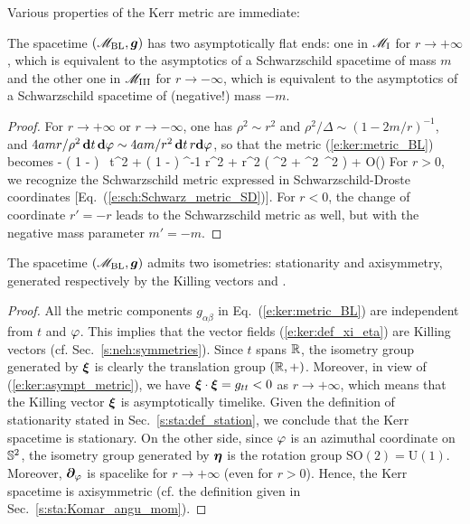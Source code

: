 Various properties of the Kerr metric are immediate:

\begin{prop}
The spacetime $(\mathscr{M}_{\rm BL},\bm{g})$ has two asymptotically flat ends: one in
$\mathscr{M}_{\rm I}$ for $r\rightarrow + \infty$, which is equivalent to the asymptotics
of a Schwarzschild spacetime of mass $m$ and the other one
in $\mathscr{M}_{\rm III}$ for $r\rightarrow - \infty$, which is equivalent to
the asymptotics of a Schwarzschild spacetime of (negative!) mass $-m$.
\end{prop}

\begin{proof}
For $r\rightarrow+\infty$ or $r\rightarrow-\infty$, one has $\rho^2\sim r^2$ and
$\rho^2/\Delta \sim (1-2m/r)^{-1}$,
and $4 a m  r / \rho^2\,  \mathbf{d} t\, \mathbf{d}\varphi \sim 4 a m/r^2 \,  \mathbf{d} t\, r\mathbf{d}\varphi$,
so that the metric (\ref{e:ker:metric_BL}) becomes
\be \label{e:ker:asympt_metric}
      \simeq  - \left( 1 -  \right) \, \dd t^2
    + \left( 1 -  \right) ^{-1} \dd r^2
    + r^2 \left( \dd \th^2 + \sin^2\th  \, \dd \ph^2 \right)
    + O\left(\right)
\ee
For $r>0$, we recognize the Schwarzschild metric expressed
in Schwarzschild-Droste coordinates [Eq.~(\ref{e:sch:Schwarz_metric_SD})].
For $r<0$, the change of coordinate $r'=-r$ leads to the Schwarzschild metric
as well, but with the negative mass parameter $m'=-m$.
\end{proof}

\begin{prop}
The spacetime $(\mathscr{M}_{\rm BL},\bm{g})$ admits two isometries:
stationarity and axisymmetry, generated respectively by the Killing
vectors
\be \label{e:ker:def_xi_eta}
     \quad\mbox{and}\quad
    \encadre{\w{\eta} := \wpar_\ph}.
\ee
\end{prop}
\begin{proof}
All the metric components $g_{\alpha\beta}$ in Eq.~(\ref{e:ker:metric_BL})
are independent from $t$ and $\varphi$. This implies that the vector fields (\ref{e:ker:def_xi_eta}) are Killing vectors (cf. Sec.~\ref{s:neh:symmetries}).
Since $t$ spans $\mathbb{R}$, the isometry group generated by $\bm{\xi}$ is clearly
the translation group $(\mathbb{R},+)$. Moreover, in
view of (\ref{e:ker:asympt_metric}), we have $\bm{\xi}\cdot\bm{\xi} = g_{tt} < 0$
as $r\rightarrow +\infty$, which means that the Killing vector $\bm{\xi}$
is asymptotically timelike. Given the definition of stationarity stated in
Sec.~\ref{s:sta:def_station}, we conclude that the Kerr spacetime is
stationary.
On the other side, since $\varphi$ is an azimuthal coordinate
on $\mathbb{S}^2$, the isometry group generated by $\bm{\eta}$ is the rotation
group $\mathrm{SO}(2) = \mathrm{U}(1)$.
Moreover, $\bm{\partial}_\varphi$ is spacelike for $r\to +\infty$ (even for $r>0$).
Hence, the Kerr spacetime is axisymmetric (cf. the definition given in Sec.~\ref{s:sta:Komar_angu_mom}).
\end{proof}

